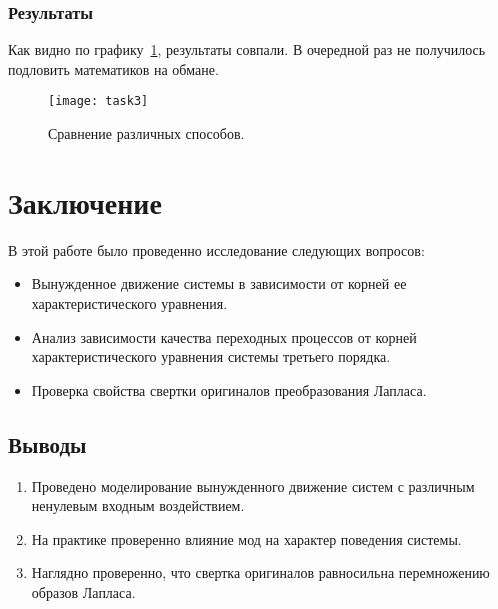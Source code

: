 \documentclass[16pt]{article}
\begin{document}
\subsubsection{Результаты}
Как видно по графику~\ref{fig:fig7}, результаты совпали. В очередной раз не получилось подловить математиков на обмане.
\begin{figure}[h]
    \centering
    \texttt{[image: task3]}
    \caption{Сравнение различных способов.}
    \label{fig:fig7}
\end{figure}

\newpage
\section{Заключение}
В этой работе было проведенно исследование следующих вопросов:
\begin{itemize}
    \item Вынужденное движение системы в зависимости от корней ее характеристического уравнения. 
    \item Анализ зависимости качества переходных процессов от корней характеристического уравнения системы третьего порядка. 
    \item Проверка свойства свертки оригиналов преобразования Лапласа. 
\end{itemize} 
\subsection{Выводы}
\begin{enumerate}
   \item Проведено моделирование вынужденного движение систем с различным ненулевым входным воздействием.
   \item На практике проверенно влияние мод на характер поведения системы.
   \item Наглядно проверенно, что свертка оригиналов равносильна перемножению образов Лапласа.
\end{enumerate}
\end{document}

